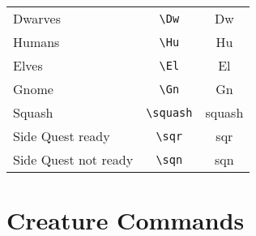 \documentclass[a4paper,openany]{book}
\begin{document}
\begin{multicols}{2}
\begin{tabularx}{\linewidth}{Xcc}
  Dwarves & {\tt \textbackslash{Dw}} & \gls{Dw} \\

  Humans & {\tt \textbackslash{Hu}} & \gls{Hu} \\

  Elves & {\tt \textbackslash{El}} & \gls{El} \\

  Gnome & {\tt \textbackslash{Gn}} & \gls{Gn} \\
  \hline
  Squash & {\tt \textbackslash{squash}} & \gls{squash} \\

  Side Quest ready & {\tt \textbackslash{sqr}} & \gls{sqr} \\

  Side Quest not ready & {\tt \textbackslash{sqn}} & \gls{sqn} \\

\end{tabularx}

\end{multicols}

\section{Creature Commands}
\end{document}
